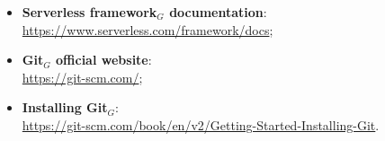 \begin{itemize}
				\item \textbf{Serverless framework$_{G}$ documentation}: \\
				\url{https://www.serverless.com/framework/docs};

				\item \textbf{Git$_{G}$ official website}: \\
				\url{https://git-scm.com/};

				\item \textbf{Installing Git$_{G}$}: \\
				\url{https://git-scm.com/book/en/v2/Getting-Started-Installing-Git}.
			\end{itemize}
